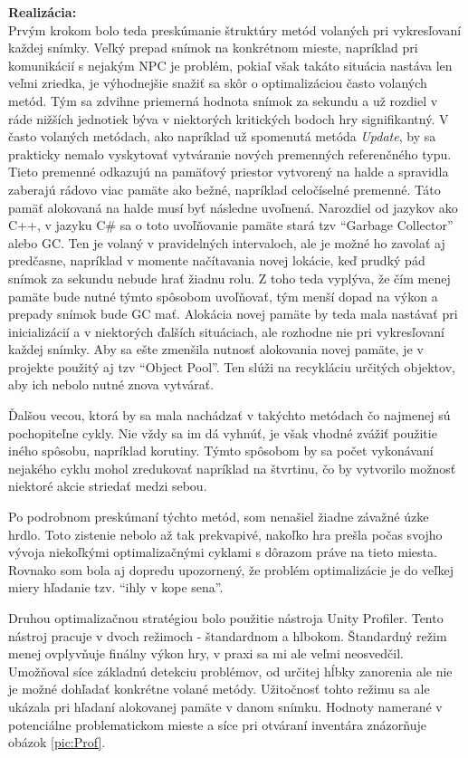 \documentclass[slovak, bachelorpractice]{diploma}
\begin{document}
\textbf{Realizácia:} \\ Prvým krokom bolo teda preskúmanie štruktúry metód volaných pri vykresľovaní každej snímky. Veľký prepad snímok na konkrétnom mieste, napríklad pri komunikácií s nejakým NPC je problém,  pokiaľ však takáto situácia nastáva len veľmi zriedka, je výhodnejšie snažiť sa skôr o optimalizáciou často volaných metód. Tým sa zdvihne priemerná hodnota snímok za sekundu a už rozdiel v ráde nižších jednotiek býva v niektorých kritických bodoch hry signifikantný. V často volaných metódach, ako napríklad už spomenutá metóda \textit{Update}, by sa prakticky nemalo vyskytovať vytváranie nových premenných referenčného typu. Tieto premenné odkazujú na pamäťový priestor vytvorený na halde a spravidla zaberajú rádovo viac pamäte ako bežné, napríklad celočíselné premenné. Táto pamäť alokovaná na halde musí byť následne uvoľnená. Narozdiel od jazykov ako C++, v jazyku C\# sa o toto uvoľňovanie pamäte stará tzv \enquote{Garbage Collector} alebo GC. Ten je volaný v pravidelných intervaloch, ale je možné ho zavolať aj predčasne, napríklad v momente načítavania novej lokácie, keď prudký pád snímok za sekundu nebude hrať žiadnu rolu. Z toho teda vyplýva, že čím menej pamäte bude nutné týmto spôsobom uvoľňovať, tým menší dopad na výkon a prepady snímok bude GC mať. Alokácia novej pamäte by teda mala nastávať pri inicializácií a v niektorých ďalších situáciach, ale rozhodne nie pri vykresľovaní každej snímky. Aby sa ešte zmenšila nutnosť alokovania novej pamäte, je v projekte použitý aj tzv \enquote{Object Pool}. Ten slúži na recykláciu určitých objektov, aby ich nebolo nutné znova vytvárať. 

Ďalšou vecou, ktorá by sa mala nachádzať v takýchto metódach čo najmenej sú pochopiteľne cykly. Nie vždy sa im dá vyhnúť, je však vhodné zvážiť použitie iného spôsobu, napríklad korutiny. Týmto spôsobom by sa počet vykonávaní nejakého cyklu mohol zredukovať napríklad na štvrtinu, čo by vytvorilo možnosť niektoré akcie striedať medzi sebou.

Po podrobnom preskúmaní týchto metód, som nenašiel žiadne závažné úzke hrdlo. Toto zistenie nebolo až tak prekvapivé, nakoľko hra prešla počas svojho vývoja niekoľkými optimalizačnými cyklami s dôrazom práve na tieto miesta. Rovnako som bola aj dopredu upozornený, že problém optimalizácie je do veľkej miery hľadanie tzv. \enquote{ihly v kope sena}.

Druhou optimalizačnou stratégiou bolo použitie nástroja Unity Profiler. Tento nástroj pracuje v dvoch režimoch - štandardnom a hlbokom. Štandardný režim menej ovplyvňuje finálny výkon hry, v praxi sa mi ale veľmi neosvedčil. Umožňoval síce základnú detekciu problémov, od určitej hĺbky zanorenia ale nie je možné dohľadať konkrétne volané metódy. Užitočnosť tohto režimu sa ale ukázala pri hľadaní alokovanej pamäte v danom snímku. Hodnoty namerané v potenciálne problematickom mieste a síce pri otváraní inventára znázorňuje obázok \ref{pic:Prof}.
\end{document}
